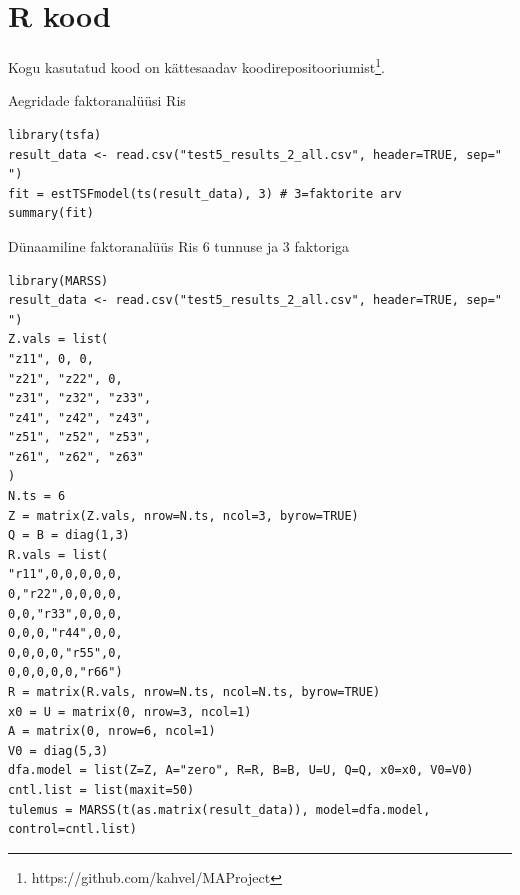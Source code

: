 \documentclass[a4paper,12pt]{report}
\begin{document}
\chapter{R kood}
Kogu kasutatud kood on kättesaadav koodirepositooriumist\footnote{https://github.com/kahvel/MAProject}.

Aegridade faktoranalüüsi Ris
\begin{verbatim}
library(tsfa)
result_data <- read.csv("test5_results_2_all.csv", header=TRUE, sep=" ")
fit = estTSFmodel(ts(result_data), 3) # 3=faktorite arv
summary(fit)
\end{verbatim}
Dünaamiline faktoranalüüs Ris 6 tunnuse ja 3 faktoriga
\begin{verbatim}
library(MARSS)
result_data <- read.csv("test5_results_2_all.csv", header=TRUE, sep=" ")
Z.vals = list(
"z11", 0, 0,
"z21", "z22", 0,
"z31", "z32", "z33",
"z41", "z42", "z43",
"z51", "z52", "z53",
"z61", "z62", "z63"
)
N.ts = 6
Z = matrix(Z.vals, nrow=N.ts, ncol=3, byrow=TRUE)
Q = B = diag(1,3)
R.vals = list(
"r11",0,0,0,0,0,
0,"r22",0,0,0,0,
0,0,"r33",0,0,0,
0,0,0,"r44",0,0,
0,0,0,0,"r55",0,
0,0,0,0,0,"r66")
R = matrix(R.vals, nrow=N.ts, ncol=N.ts, byrow=TRUE)
x0 = U = matrix(0, nrow=3, ncol=1)
A = matrix(0, nrow=6, ncol=1)
V0 = diag(5,3)
dfa.model = list(Z=Z, A="zero", R=R, B=B, U=U, Q=Q, x0=x0, V0=V0)
cntl.list = list(maxit=50)
tulemus = MARSS(t(as.matrix(result_data)), model=dfa.model, control=cntl.list)
\end{verbatim}
\end{document}
